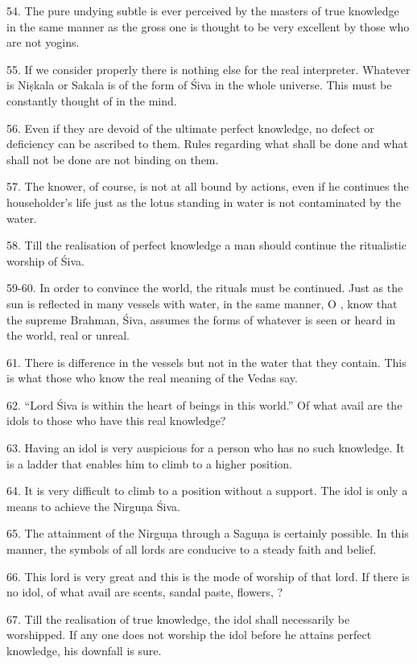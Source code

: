 54. The pure undying subtle  is ever perceived by the masters of true
knowledge in the same manner as the gross one is thought to be very excellent by
those who are not yogins.

55. If we consider properly there is nothing else for the real interpreter.
Whatever is Niṣkala or Sakala is of the form of Śiva in the whole universe. This
must be constantly thought of in the mind.

56. Even if they are devoid of the ultimate perfect knowledge, no defect or
deficiency can be ascribed to them. Rules regarding what shall be done and what
shall not be done are not binding on them.

57. The knower, of course, is not at all bound by actions, even if he continues
the householder’s life just as the lotus standing in water is not contaminated
by the water.

58. Till the realisation of perfect knowledge a man should continue
the ritualistic worship of Śiva.

59-60. In order to convince the world, the rituals must be continued. Just as
the sun is reflected in many vessels with water, in the same manner, O ,
know that the supreme Brahman, Śiva, assumes the forms of whatever is seen or
heard in the world, real or unreal.

61. There is difference in the vessels but not in the water that they contain.
This is what those who know the real meaning of the Vedas say.

62. “Lord Śiva is within the heart of beings in this world.” Of what avail are
the idols to those who have this real knowledge?

63. Having an idol is very auspicious for a person who has no such knowledge.
It is a ladder that enables him to climb to a higher position.

64. It is very difficult to climb to a position without a support. The idol is
only a means to achieve the Nirguṇa Śiva.

65. The attainment of the Nirguṇa through a Saguṇa is certainly possible. In
this manner, the symbols of all lords are conducive to a steady faith and belief.

66. This lord is very great and this is the mode of worship of that lord. If
there is no idol, of what avail are scents, sandal paste, flowers, \etc?

67. Till the realisation of true knowledge, the idol shall necessarily be
worshipped. If any one does not worship the idol before he attains perfect
knowledge, his downfall is sure.

